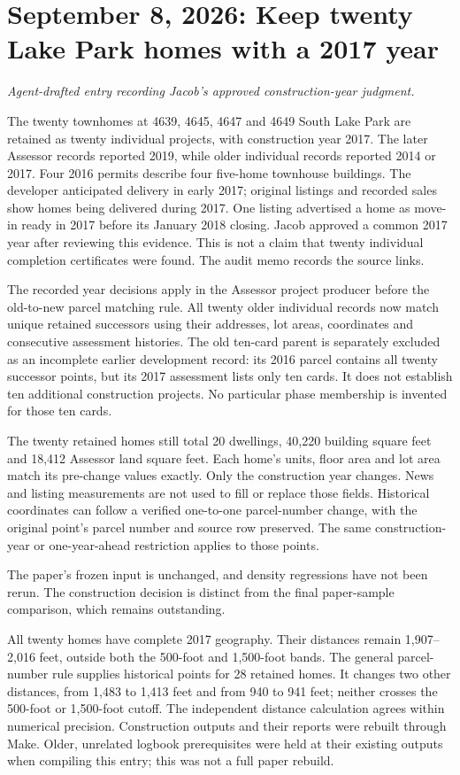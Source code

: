 \section*{September 8, 2026: Keep twenty Lake Park homes with a 2017 year}
\textit{Agent-drafted entry recording Jacob's approved construction-year judgment.}

The twenty townhomes at 4639, 4645, 4647 and 4649 South Lake Park are retained
as twenty individual projects, with construction year 2017. The later Assessor
records reported 2019, while older individual records reported 2014 or 2017.
Four 2016 permits describe four five-home townhouse buildings. The developer
anticipated delivery in early 2017; original listings and recorded sales show
homes being delivered during 2017. One listing advertised a home as move-in
ready in 2017 before its January 2018 closing. Jacob approved a common 2017
year after reviewing this evidence. This is not a claim that twenty individual
completion certificates were found. The audit memo records the source links.

The recorded year decisions apply in the Assessor project producer before the
old-to-new parcel matching rule. All twenty older individual records now match
unique retained successors using their addresses, lot areas, coordinates and
consecutive assessment histories. The old ten-card parent is separately
excluded as an incomplete earlier development record: its 2016 parcel contains
all twenty successor points, but its 2017 assessment lists only ten cards.
It does not establish ten additional construction projects. No particular
phase membership is invented for those ten cards.

The twenty retained homes still total 20 dwellings, 40,220 building square feet
and 18,412 Assessor land square feet. Each home's units, floor area and lot area
match its pre-change values exactly. Only the construction year changes.
News and listing measurements are not used to fill or replace those fields.
Historical coordinates can follow a verified one-to-one parcel-number change,
with the original point's parcel number and source row preserved. The same
construction-year or one-year-ahead restriction applies to those points.

The paper's frozen input is unchanged, and density regressions have not been
rerun. The construction decision is distinct from the final paper-sample
comparison, which remains outstanding.

All twenty homes have complete 2017 geography. Their distances remain
1,907--2,016 feet, outside both the 500-foot and 1,500-foot bands. The general
parcel-number rule supplies historical points for 28 retained homes. It changes
two other distances, from 1,483 to 1,413 feet and from 940 to 941 feet; neither
crosses the 500-foot or 1,500-foot cutoff. The independent distance calculation
agrees within numerical precision. Construction outputs and their reports were
rebuilt through Make. Older, unrelated logbook prerequisites were held at their
existing outputs when compiling this entry; this was not a full paper rebuild.
